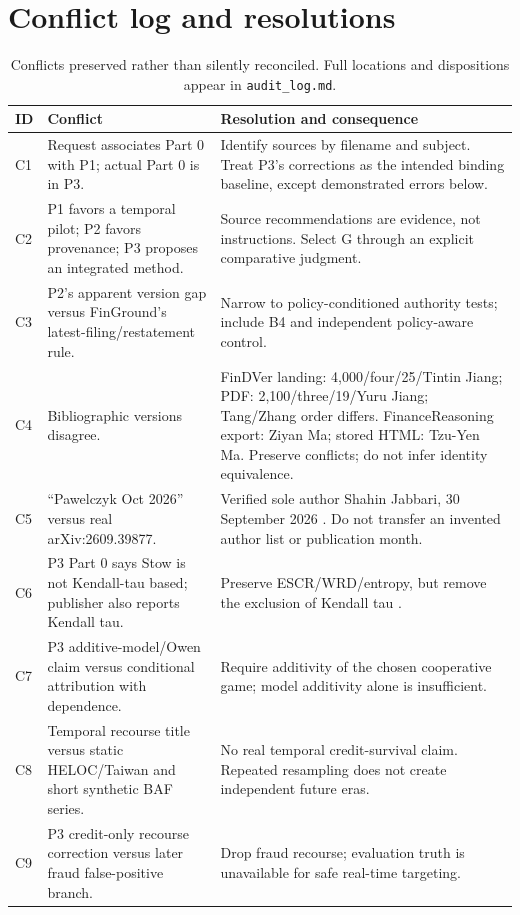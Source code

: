 \documentclass[11pt,a4paper]{article}
\begin{document}
\section{Conflict log and resolutions}
\begin{table}[H]\caption{Conflicts preserved rather than silently reconciled. Full locations and dispositions appear in \texttt{audit\_log.md}.}
\small\begin{tabularx}{\linewidth}{p{.08\linewidth}YY}\toprule
ID & Conflict & Resolution and consequence\\\midrule
C1 & Request associates Part 0 with P1; actual Part 0 is in P3. & Identify sources by filename and subject. Treat P3's corrections as the intended binding baseline, except demonstrated errors below.\\
C2 & P1 favors a temporal pilot; P2 favors provenance; P3 proposes an integrated method. & Source recommendations are evidence, not instructions. Select G through an explicit comparative judgment.\\
C3 & P2's apparent version gap versus FinGround's latest-filing/restatement rule. & Narrow to policy-conditioned authority tests; include B4 and independent policy-aware control.\\
C4 & Bibliographic versions disagree. & FinDVer landing: 4,000/four/25/Tintin Jiang; PDF: 2,100/three/19/Yuru Jiang; Tang/Zhang order differs. FinanceReasoning export: Ziyan Ma; stored HTML: Tzu-Yen Ma. Preserve conflicts; do not infer identity equivalence.\\
C5 & “Pawelczyk Oct 2026” versus real arXiv:2609.39877. & Verified sole author Shahin Jabbari, 30 September 2026 \cite{jabbari}. Do not transfer an invented author list or publication month.\\
C6 & P3 Part 0 says Stow is not Kendall-tau based; publisher also reports Kendall tau. & Preserve ESCR/WRD/entropy, but remove the exclusion of Kendall tau \cite{stow}.\\
C7 & P3 additive-model/Owen claim versus conditional attribution with dependence. & Require additivity of the chosen cooperative game; model additivity alone is insufficient.\\
C8 & Temporal recourse title versus static HELOC/Taiwan and short synthetic BAF series. & No real temporal credit-survival claim. Repeated resampling does not create independent future eras.\\
C9 & P3 credit-only recourse correction versus later fraud false-positive branch. & Drop fraud recourse; evaluation truth is unavailable for safe real-time targeting.\\

\end{tabularx}
\end{table}
\end{document}
